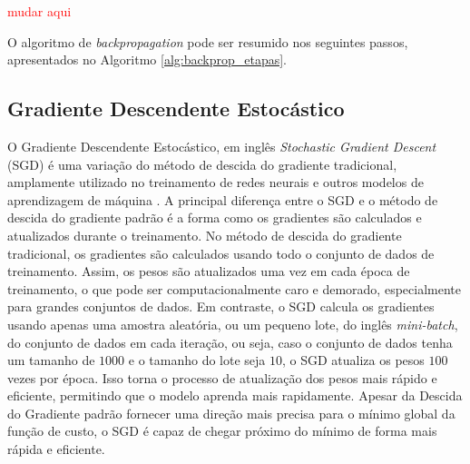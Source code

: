 \textcolor{red}{mudar aqui}

O algoritmo de \textit{backpropagation} pode ser resumido nos seguintes passos, apresentados no Algoritmo \ref{alg:backprop_etapas}.

\vspace{0.5cm}
\begin{algorithm}[H]
\caption{Etapas do treinamento via \textit{backpropagation}.}
\label{alg:backprop_etapas}

\BlankLine
{}
\end{algorithm}

\vspace{0.5cm}

\subsection{Gradiente Descendente Estocástico}
\label{subsec:sgd}
O Gradiente Descendente Estocástico, em inglês \textit{Stochastic Gradient Descent} (SGD) é uma variação do método de descida do gradiente tradicional, amplamente utilizado no treinamento de redes neurais e outros modelos de aprendizagem de máquina \cite{sebastianruder2016}. A principal diferença entre o SGD e o método de descida do gradiente padrão é a forma como os gradientes são calculados e atualizados durante o treinamento. No método de descida do gradiente tradicional, os gradientes são calculados usando todo o conjunto de dados de treinamento. Assim, os pesos são atualizados uma vez em cada época de treinamento, o que pode ser computacionalmente caro e demorado, especialmente para grandes conjuntos de dados. Em contraste, o SGD calcula os gradientes usando apenas uma amostra aleatória, ou um pequeno lote, do inglês \textit{mini-batch}, do conjunto de dados em cada iteração, ou seja, caso o conjunto de dados tenha um tamanho de $1000$ e o tamanho do lote seja $10$, o SGD atualiza os pesos $100$ vezes por época. Isso torna o processo de atualização dos pesos mais rápido e eficiente, permitindo que o modelo aprenda mais rapidamente. 
Apesar da Descida do Gradiente padrão fornecer uma direção mais precisa para o mínimo global da função de custo, o SGD é capaz de chegar próximo do mínimo de forma mais rápida e eficiente.

